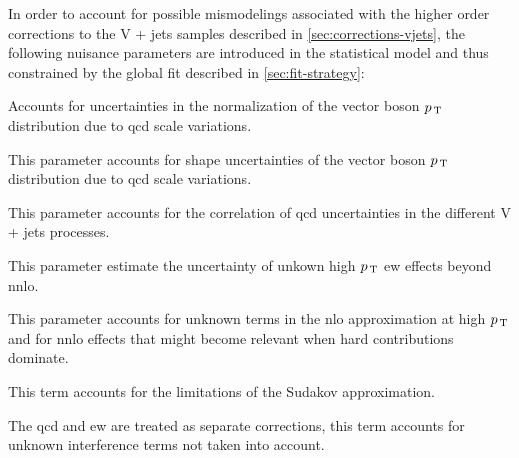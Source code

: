 In order to account for possible mismodelings associated with the higher order
corrections to the V + jets samples described in \cref{sec:corrections-vjets},
the following nuisance parameters are introduced in the statistical model and
thus constrained by the global fit described in \cref{sec:fit-strategy}:
\begin{description}[font=\normalfont]
\item[$\delta_1 k_\mathrm{NLO}$:] Accounts for uncertainties in the
  normalization of the vector boson $p_\mathrm{\, T}$ distribution due to \gls{qcd} scale
  variations.
\item[$\delta_2 k_\mathrm{NLO}$:] This parameter accounts for shape
  uncertainties of the vector boson $p_\mathrm{\, T}$ distribution due to \gls{qcd} scale
  variations.
\item[$\delta_3 k_\mathrm{NLO}$:] This parameter accounts for the correlation of
  \gls{qcd} uncertainties in the different V + jets processes.
\item[$\delta_1 k_\mathrm{EW}$:] This parameter estimate the uncertainty of
  unkown high $p_\mathrm{\, T}$ \gls{ew} effects beyond \gls{nnlo}.
\item[$\delta_2 k_\mathrm{EW}$:] This parameter accounts for unknown terms in
  the \gls{nlo} approximation at high $p_\mathrm{\, T}$ and for \gls{nnlo} effects that
  might become relevant when hard contributions dominate.
\item[$\delta_3 k_\mathrm{EW}$:] This term accounts for the limitations of the
  Sudakov approximation.
\item[$\delta_3 k_\mathrm{mix}$:] The \gls{qcd} and \gls{ew} are treated as
  separate corrections, this term accounts for unknown interference terms not
  taken into account.
\end{description}
